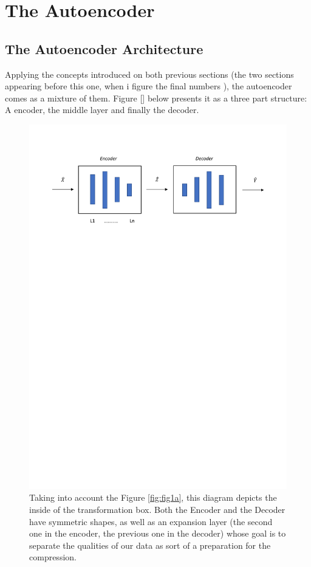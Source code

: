 \documentclass[12pt]{report}
\begin{document}
\section{The Autoencoder}

\subsection{The Autoencoder Architecture}

Applying the concepts introduced on both previous sections (the two sections appearing before this one, when  i figure the final numbers ), the autoencoder comes as a mixture of them. Figure [] below presents it as a three part structure: A encoder, the middle layer and finally the decoder. \par

\begin{figure}[H]
	\centering
	\includegraphics[width=16cm]{Figuras_tfg/Figura_autoencoder}
	\caption{Taking into account the Figure \ref{fig:fig1a}, this diagram depicts the inside of the transformation box. Both the Encoder and the Decoder have symmetric shapes, as well as an expansion layer (the second one in the encoder, the previous one in the decoder) whose goal is to separate the qualities of our data as sort of a preparation for the compression.}
	\label{fig:figure_autoencoder}
\end{figure} 
\end{document}
